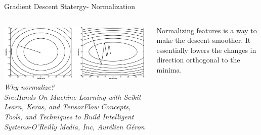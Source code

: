   \begin{frame}{Gradient Descent Statergy- Normalization}
	\begin{columns}[T]
        \begin{column}{0.6\textwidth}
        	\includegraphics[width=\textwidth]{images/normalise.png}
        	\tiny{\textit{Why normalize?\\ Src:Hands-On Machine Learning with Scikit-Learn, Keras, and TensorFlow  Concepts, Tools, and Techniques to Build Intelligent Systems-O'Reilly Media, Inc, Aurélien Géron}}
        \end{column}
	    \begin{column}{0.4\textwidth}
    	    Normalizing features is a way to make the descent smoother. It essentially lowers the changes in direction orthogonal to the minima.
    	\end{column}
    \end{columns}
\end{frame}


